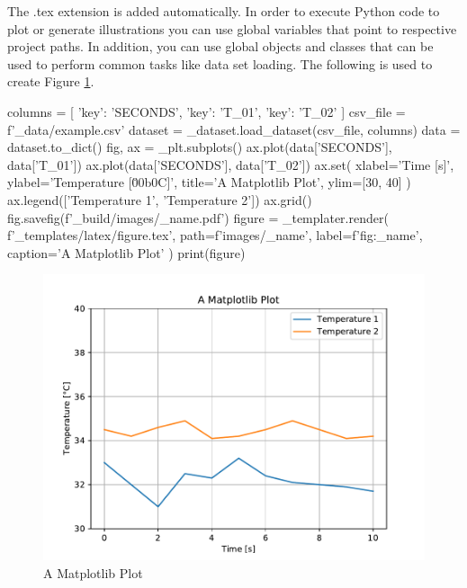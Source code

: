 \documentclass[a4paper]{book}
\begin{document}
The .tex extension is added automatically. In order to execute Python code to plot or generate illustrations you can use global variables that point to respective project paths. In addition, you can use global objects and classes that can be used to perform common tasks like data set loading. The following is used to create Figure \ref{fig:a_matplotlib_plot}.
\begin{python}
columns = [
    {'key': 'SECONDS'},
    {'key': 'T_01'},
    {'key': 'T_02'}
]
csv_file = f'{_data}/example.csv'
dataset = _dataset.load_dataset(csv_file, columns)
data = dataset.to_dict()
fig, ax = _plt.subplots()
ax.plot(data['SECONDS'], data['T_01'])
ax.plot(data['SECONDS'], data['T_02'])
ax.set(
    xlabel='Time [s]',
    ylabel='Temperature [\u00b0C]',
    title='A Matplotlib Plot',
    ylim=[30, 40]
)
ax.legend(['Temperature 1', 'Temperature 2'])
ax.grid()
fig.savefig(f'{_build}/images/{_name}.pdf')
figure = _templater.render(
    f'{_templates}/latex/figure.tex',
    path=f'images/{_name}',
    label=f'fig:{_name}',
    caption='A Matplotlib Plot'
)
print(figure)

\end{python}
\begin{figure}[H]
\begin{center}
  \includegraphics[width=\textwidth]{images/a_matplotlib_plot}
  \caption{A Matplotlib Plot}
  \label{fig:a_matplotlib_plot}
\end{center}
\end{figure}
\end{document}
